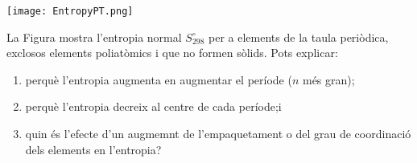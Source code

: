 
\begin{exr}
\begin{center}
\texttt{[image: EntropyPT.png]}
\end{center}

La Figura mostra l'entropia normal $S^{\circ}_{298}$ per a elements de la taula periòdica, exclosos elements poliatòmics i que no formen sòlids.\cite{thoms_periodic_1995} Pots explicar:
\begin{enumerate}
\item perquè l'entropia augmenta en augmentar el període ($n$ més gran);
\item perquè l'entropia decreix al centre de cada període;i
\item quin és l'efecte d'un augmemnt de l'empaquetament o del grau de coordinació dels elements en l'entropia?
\end{enumerate}
\end{exr}